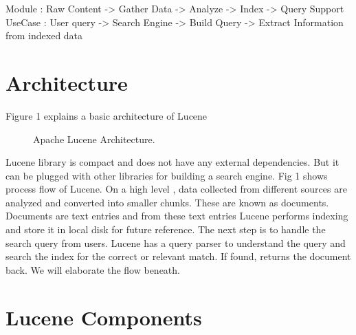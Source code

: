 \documentclass[9pt,twocolumn,twoside]{styles/osajnl}
\begin{document}
Module  : Raw Content -> Gather Data -> Analyze -> Index ->  Query Support 
UseCase : User query -> Search Engine -> Build Query -> Extract Information from indexed data

\section{Architecture}
Figure 1 explains a basic architecture of Lucene

\begin{figure}[htbp]
\centering
{}
\caption{Apache Lucene Architecture.}
\label{fig:lucene-data-flow}
\end{figure}

Lucene library is compact and does not have any external dependencies. But it can be plugged with other libraries for building a search engine. Fig 1\cite{lucene-book} shows process flow of Lucene. On a high level , data collected from different sources are analyzed and converted into smaller chunks. These are known as documents. Documents are text entries and from these text entries Lucene performs indexing and store it in local disk for future reference. The next step is to handle the search query from users. Lucene has a query parser to understand the query and search the index for the correct or relevant match. If found, returns the document back. We will elaborate the flow beneath.

\section{Lucene Components}
\end{document}
